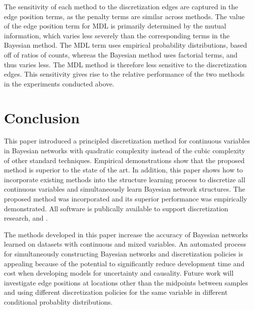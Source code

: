 The sensitivity of each method to the discretization edges are captured in the edge position terms, as the penalty terms are similar across methods.
The value of the edge position term for MDL is primarily determined by the mutual information, which varies less severely than the corresponding terms in the Bayesian method.
The MDL term uses empirical probability distributions, based off of ratios of counts, whereas the Bayesian method uses factorial terms, and thus varies less.
The MDL method is therefore less sensitive to the discretization edges.
This sensitivity gives rise to the relative performance of the two methods in the experiments conducted above.

\section{Conclusion}
This paper introduced a principled discretization method for continuous variables in Bayesian networks with quadratic complexity instead of the cubic complexity of other standard techniques.
Empirical demonstrations show that the proposed method is superior to the state of the art.
In addition, this paper shows how to incorporate existing methods into the structure learning process to discretize all continuous variables and simultaneously learn Bayesian network structures.
The proposed method was incorporated and its superior performance was empirically demonstrated.
All software is publically available to support discretization research, and .

The methods developed in this paper increase the accuracy of Bayesian networks learned on datasets with continuous and mixed variables.
An automated process for simultaneously constructing Bayesian networks and discretization policies is appealing because of the potential to significantly reduce development time and cost when developing models for uncertainty and causality.
Future work will investigate edge positions at locations other than the midpoints between samples and using different discretization policies for the same variable in different conditional probablity distributions.



